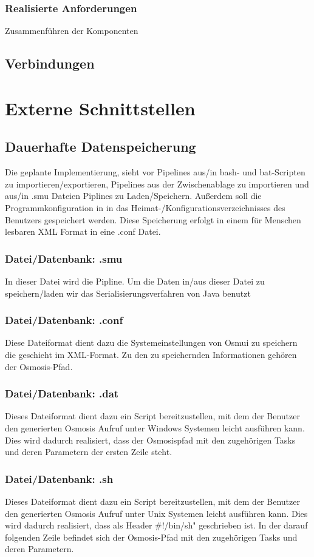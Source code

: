 \documentclass[a4paper,12pt]{scrartcl}
\begin{document}
\subsubsection{Realisierte Anforderungen}
Zusammenführen der Komponenten


\subsection{Verbindungen}
\section{Externe Schnittstellen}
\subsection{Dauerhafte Datenspeicherung}
Die geplante Implementierung, sieht vor Pipelines aus/in bash- und bat-Scripten zu importieren/exportieren, Pipelines aus der Zwischenablage zu importieren und aus/in .smu Dateien Piplines zu Laden/Speichern. Außerdem soll die Programmkonfiguration in in das Heimat-/Konfigurationsverzeichnisses des Benutzers gespeichert werden. Diese Speicherung erfolgt in einem für Menschen lesbaren XML Format in eine .conf Datei.
\subsubsection{Datei/Datenbank: .smu}
In dieser Datei wird die Pipline. Um die Daten in/aus dieser Datei zu speichern/laden wir das Serialisierungsverfahren von Java benutzt 
\subsubsection{Datei/Datenbank: .conf}
Diese  Dateiformat dient dazu die Systemeinstellungen von Osmui zu speichern die geschieht im XML-Format. Zu den zu speichernden Informationen gehören der Osmosis-Pfad.
\subsubsection{Datei/Datenbank: .dat}
Dieses Dateiformat dient dazu ein Script bereitzustellen, mit dem der Benutzer den generierten Osmosis Aufruf unter Windows Systemen leicht ausführen kann. Dies wird dadurch realisiert, dass der Osmosispfad mit den zugehörigen Tasks und deren Parametern der ersten Zeile steht.
\subsubsection{Datei/Datenbank: .sh}
Dieses Dateiformat dient dazu ein Script bereitzustellen, mit dem der Benutzer den generierten Osmosis Aufruf unter Unix Systemen leicht ausführen kann. Dies wird dadurch realisiert, dass als Header \glqq \#!/bin/sh" geschrieben ist. In der darauf folgenden Zeile befindet sich der Osmosis-Pfad mit den zugehörigen Tasks und deren Parametern.
\end{document}
